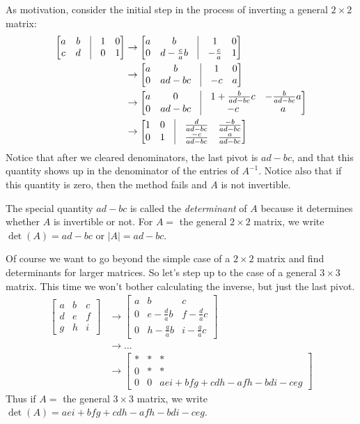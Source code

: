 \documentclass[11pt,oneside]{amsbook}
\theoremstyle{definition}
\theoremstyle{plain}
\theoremstyle{definition}
\theoremstyle{remark}
\numberwithin{equation}{section}
\numberwithin{figure}{section}
\begin{document}
As motivation, consider the initial step in the process of inverting a general $2\times2$ matrix:
\begin{align*}
  \begin{bmatrix}a&b&\vline&1&0\\c&d&\vline&0&1\end{bmatrix}
  &\to\begin{bmatrix}a&b&\vline&1&0\\
    0&d-\frac{c}{a}b&\vline&-\frac{c}{a}&1\end{bmatrix}\\
  &\to\begin{bmatrix}a&b&\vline&1&0\\0&ad-bc&\vline&-c&a\end{bmatrix}\\
  &\to\begin{bmatrix}a&0&\vline&1+\frac{b}{ad-bc}c&-\frac{b}{ad-bc}a\\
    0&ad-bc&\vline&-c&a\end{bmatrix}\\
  &\to\begin{bmatrix}1&0&\vline&\frac{d}{ad-bc}&\frac{-b}{ad-bc}\\
    0&1&\vline&\frac{-c}{ad-bc}&\frac{a}{ad-bc}\end{bmatrix}\\
\end{align*}
Notice that after we cleared denominators, the last pivot is $ad-bc$, and that this quantity shows up in the denominator of the entries of $A^{-1}$. Notice also that if this quantity is zero, then the method fails and $A$ is not invertible.

The special quantity $ad-bc$ is called the \emph{determinant} of $A$ because it determines whether $A$ is invertible or not. For $A=$ the general $2\times2$ matrix, we write $\det(A)=ad-bc$ or $|A|=ad-bc$.

Of course we want to go beyond the simple case of a $2\times2$ matrix and find determinants for larger matrices. So let's step up to the case of a general $3\times3$ matrix. This time we won't bother calculating the inverse, but just the last pivot.
\begin{align*}
  \begin{bmatrix}a&b&c\\d&e&f\\g&h&i\end{bmatrix}
  &\to\begin{bmatrix}a&b&c\\0&e-\frac dab&f-\frac dac
    \\0&h-\frac gab&i-\frac gac\end{bmatrix}\\
  &\to\ldots\\
  &\to\begin{bmatrix}*&*&*\\0&*&*\\0&0&aei+bfg+cdh-afh-bdi-ceg\end{bmatrix}
\end{align*}
Thus if $A=$ the general $3\times3$ matrix, we write $\det(A)=aei+bfg+cdh-afh-bdi-ceg$.
\end{document}
